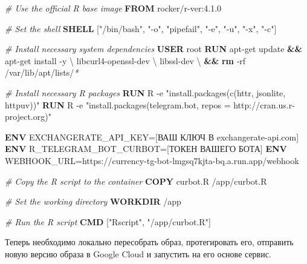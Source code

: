 \documentclass[
]{book}
\newenvironment{Shaded}{\begin{snugshade}}{\end{snugshade}}
\newcommand{\AttributeTok}[1]{\textcolor[rgb]{0.13,0.29,0.53}{#1}}
\newcommand{\CommentTok}[1]{\textcolor[rgb]{0.56,0.35,0.01}{\textit{#1}}}
\newcommand{\DataTypeTok}[1]{\textcolor[rgb]{0.13,0.29,0.53}{#1}}
\newcommand{\ExtensionTok}[1]{#1}
\newcommand{\FunctionTok}[1]{\textcolor[rgb]{0.13,0.29,0.53}{\textbf{#1}}}
\newcommand{\KeywordTok}[1]{\textcolor[rgb]{0.13,0.29,0.53}{\textbf{#1}}}
\newcommand{\NormalTok}[1]{#1}
\newcommand{\PreprocessorTok}[1]{\textcolor[rgb]{0.56,0.35,0.01}{\textit{#1}}}
\newcommand{\StringTok}[1]{\textcolor[rgb]{0.31,0.60,0.02}{#1}}
\begin{document}
\begin{Shaded}
\begin{Highlighting}[]
\CommentTok{\# Use the official R base image}
\KeywordTok{FROM}\NormalTok{ rocker/r{-}ver:4.1.0}

\CommentTok{\# Set the shell}
\KeywordTok{SHELL}\NormalTok{ [}\StringTok{"/bin/bash"}\NormalTok{, }\StringTok{"{-}o"}\NormalTok{, }\StringTok{"pipefail"}\NormalTok{, }\StringTok{"{-}e"}\NormalTok{, }\StringTok{"{-}u"}\NormalTok{, }\StringTok{"{-}x"}\NormalTok{, }\StringTok{"{-}c"}\NormalTok{]}

\CommentTok{\# Install necessary system dependencies}
\KeywordTok{USER}\NormalTok{ root}
\KeywordTok{RUN} \ExtensionTok{apt{-}get}\NormalTok{ update }\KeywordTok{\&\&} \ExtensionTok{apt{-}get}\NormalTok{ install }\AttributeTok{{-}y} \DataTypeTok{\textbackslash{}}
\NormalTok{    libcurl4{-}openssl{-}dev }\DataTypeTok{\textbackslash{}}
\NormalTok{    libssl{-}dev }\DataTypeTok{\textbackslash{}}
    \KeywordTok{\&\&} \FunctionTok{rm} \AttributeTok{{-}rf}\NormalTok{ /var/lib/apt/lists/}\PreprocessorTok{*}

\CommentTok{\# Install necessary R packages}
\KeywordTok{RUN} \ExtensionTok{R} \AttributeTok{{-}e} \StringTok{"install.packages(c(\textquotesingle{}httr\textquotesingle{}, \textquotesingle{}jsonlite\textquotesingle{}, \textquotesingle{}httpuv\textquotesingle{}))"}
\KeywordTok{RUN} \ExtensionTok{R} \AttributeTok{{-}e} \StringTok{"install.packages(\textquotesingle{}telegram.bot\textquotesingle{}, repos = \textquotesingle{}http://cran.us.r{-}project.org\textquotesingle{})"}

\KeywordTok{ENV}\NormalTok{ EXCHANGERATE\_API\_KEY=[ВАШ КЛЮЧ В exchangerate{-}api.com]}
\KeywordTok{ENV}\NormalTok{ R\_TELEGRAM\_BOT\_CURBOT=[ТОКЕН ВАШЕГО БОТА]}
\KeywordTok{ENV}\NormalTok{ WEBHOOK\_URL=https://currency{-}tg{-}bot{-}lmgsq7kjta{-}bq.a.run.app/webhook}

\CommentTok{\# Copy the R script to the container}
\KeywordTok{COPY}\NormalTok{ curbot.R /app/curbot.R}

\CommentTok{\# Set the working directory}
\KeywordTok{WORKDIR}\NormalTok{ /app}

\CommentTok{\# Run the R script}
\KeywordTok{CMD}\NormalTok{ [}\StringTok{"Rscript"}\NormalTok{, }\StringTok{"/app/curbot.R"}\NormalTok{]}
\end{Highlighting}
\end{Shaded}

Теперь необходимо локально пересобрать образ, протегировать его, отправить новую версию образа в Google Cloud и запустить на его основе сервис.
\end{document}
